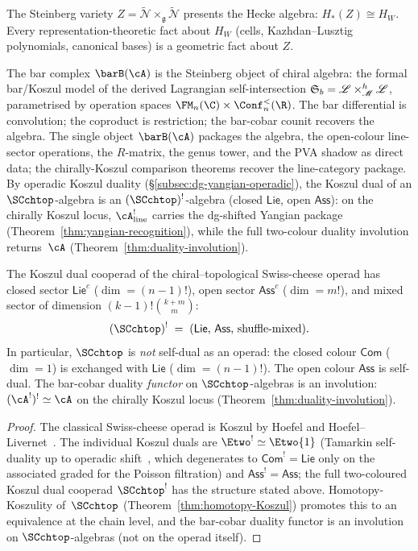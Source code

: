 The Steinberg variety $Z = \widetilde{\mathcal{N}}
\times_{\mathfrak{g}} \widetilde{\mathcal{N}}$ presents the Hecke
algebra: $H_*(Z) \cong H_W$. Every representation-theoretic fact
about $H_W$ (cells, Kazhdan--Lusztig polynomials, canonical bases)
is a geometric fact about $Z$.

The bar complex $\barB(\cA)$ is the Steinberg object of chiral
algebra: the formal bar/Koszul model of the derived Lagrangian
self-intersection $\mathfrak{S}_b = \mathscr{L} \times_{\mathscr{M}}^h
\mathscr{L}$, parametrised by operation spaces
$\FM_n(\C) \times \Conf_n^{<}(\R)$. The bar differential is
convolution; the coproduct is restriction; the bar-cobar counit
recovers the algebra. The single object $\barB(\cA)$ packages the
algebra, the open-colour line-sector operations, the $R$-matrix, the
genus tower, and the PVA shadow as direct data; the chirally-Koszul
comparison theorems recover the line-category package.
By operadic Koszul duality
(\S\ref{subsec:dg-yangian-operadic}), the Koszul dual
of an $\SCchtop$-algebra is an $(\SCchtop)^!$-algebra
(closed $\mathsf{Lie}$, open $\mathsf{Ass}$):
on the chirally Koszul locus, $\cA^!_{\mathrm{line}}$ carries the dg-shifted Yangian package
(Theorem~\ref{thm:yangian-recognition}), while the full
two-colour duality involution returns~$\cA$
(Theorem~\ref{thm:duality-involution}).

\begin{proposition}
\label{thm:SC-self-duality}
The Koszul dual cooperad of the chiral--topological Swiss-cheese
operad has closed sector $\mathsf{Lie}^c$
\textup{(}$\dim = (n-1)!$\textup{)},
open sector $\mathsf{Ass}^c$ \textup{(}$\dim = m!$\textup{)},
and mixed sector of dimension $(k-1)!\binom{k+m}{m}$:
\[
(\SCchtop)^! \;=\; (\mathsf{Lie},\, \mathsf{Ass},\,
\text{shuffle-mixed}).
\]
In particular, $\SCchtop$ is \emph{not} self-dual as an operad:
the closed colour $\mathsf{Com}$ \textup{(}$\dim = 1$\textup{)}
is exchanged with $\mathsf{Lie}$ \textup{(}$\dim = (n-1)!$\textup{)}.
The open colour $\mathsf{Ass}$ is self-dual.
The bar-cobar duality \emph{functor} on $\SCchtop$-algebras
is an involution: $(\cA^!)^! \simeq \cA$ on the chirally Koszul
locus \textup{(}Theorem~\textup{\ref{thm:duality-involution})}.
\end{proposition}

\begin{proof}
The classical Swiss-cheese operad is Koszul
by Hoefel and Hoefel--Livernet~\cite{Hoe09,HL12}.
The individual Koszul duals are
$\Etwo^{!} \simeq \Etwo\{1\}$ (Tamarkin self-duality up to
operadic shift~\cite{Tam03}, which degenerates to
$\mathsf{Com}^! = \mathsf{Lie}$ only on the associated graded
for the Poisson filtration) and
$\mathsf{Ass}^! = \mathsf{Ass}$;
the full two-coloured Koszul dual cooperad
${\SCchtop}^{!}$ has the structure stated above.
Homotopy-Koszulity of~$\SCchtop$
(Theorem~\ref{thm:homotopy-Koszul}) promotes this to an
equivalence at the chain level, and the bar-cobar
duality functor is an involution on $\SCchtop$-algebras
(not on the operad itself).
\end{proof}

